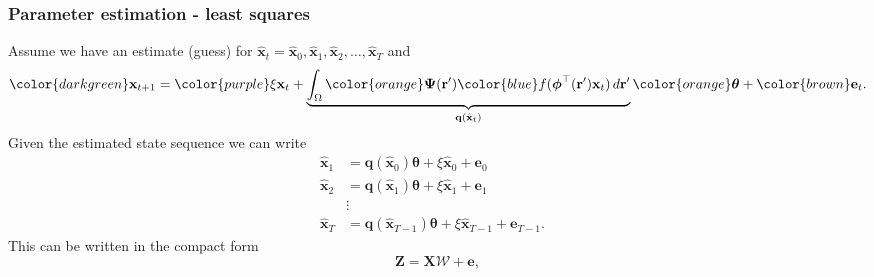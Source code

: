 \documentclass[compress]{beamer}
\begin{document}
\begin{frame}\frametitle{Parameter estimation - least squares}
	Assume we have an estimate (guess) for $\hat{\mathbf{x}}_{t} = \hat{\mathbf{x}}_{0}, \hat{\mathbf{x}}_{1}, \hat{\mathbf{x}}_{2}, \hdots, \hat{\mathbf{x}}_{T}$ \pause and
	\begin{equation}
			{\color{darkgreen}\mathbf{x}_{t+1}} = {\color{purple}\xi\mathbf{x}_t} 
		+ \underbrace{\int_\Omega {\color{orange}\boldsymbol{\Psi}(\mathbf{r}')} {\color{blue}f(\boldsymbol{\phi}^{\top}(\mathbf{r}')\mathbf{x}_t)} \, d\mathbf{r}' }_{\mathbf{q}(\hat{\mathbf{x}}_t)}{\color{orange}\boldsymbol{\theta}} + {\color{brown}\mathbf{e}_t}.
	\end{equation}
\pause
Given the estimated state sequence we can write
\begin{align*}
	 \hat{\mathbf x}_{1} &= \mathbf{q}(\hat{\mathbf x}_0) \boldsymbol{\theta}+\xi\hat{\mathbf x}_0+\mathbf e_0 \\
	\hat{\mathbf x}_{2} &= \mathbf{q}(\hat{\mathbf x}_1) \boldsymbol{\theta}+\xi\hat{\mathbf x}_1+\mathbf e_1  \\
	&\vdots& \\
	\hat{\mathbf x}_{T}&= \mathbf{q}(\hat{\mathbf x}_{T-1}) \boldsymbol{\theta}+\xi\hat{\mathbf x}_{T-1}+\mathbf e_{T-1}. 
\end{align*}
\pause
This can be written in the compact form
\begin{equation}
	\mathbf Z=\mathbf X \mathcal W+\mathbf{e}, 
\end{equation}
\end{frame}
\end{document}
